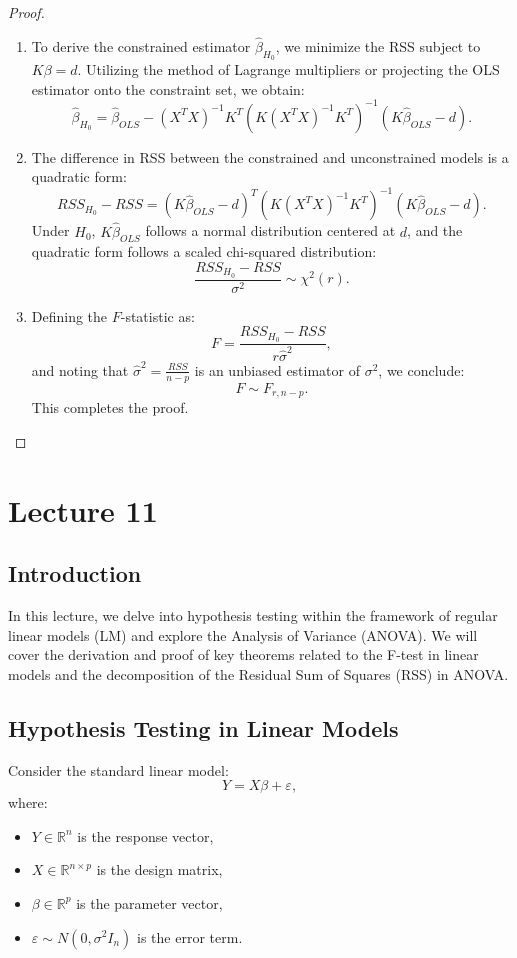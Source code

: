 \documentclass[open=any, 11pt,paper=A4]{scrreprt}
\begin{document}
\begin{proof}
\begin{enumerate}
    \item 
    To derive the constrained estimator \(\hat{\beta}_{H_0}\), we minimize the RSS subject to \(K\beta = d\). Utilizing the method of Lagrange multipliers or projecting the OLS estimator onto the constraint set, we obtain:
    \[
    \hat{\beta}_{H_0} = \hat{\beta}_{OLS} - (X^TX)^{-1} K^T (K (X^TX)^{-1} K^T)^{-1} (K \hat{\beta}_{OLS} - d).
    \]
    
    \item 
    The difference in RSS between the constrained and unconstrained models is a quadratic form:
    \[
    RSS_{H_0} - RSS = (K \hat{\beta}_{OLS} - d)^T (K (X^TX)^{-1} K^T)^{-1} (K \hat{\beta}_{OLS} - d).
    \]
    Under \(H_0\), \(K\hat{\beta}_{OLS}\) follows a normal distribution centered at \(d\), and the quadratic form follows a scaled chi-squared distribution:
    \[
    \frac{RSS_{H_0} - RSS}{\sigma^2} \sim \chi^2(r).
    \]
    
    \item 
    Defining the \(F\)-statistic as:
    \[
    F = \frac{RSS_{H_0} - RSS}{r \hat{\sigma}^2},
    \]
    and noting that \(\hat{\sigma}^2 = \frac{RSS}{n - p}\) is an unbiased estimator of \(\sigma^2\), we conclude:
    \[
    F \sim F_{r, n - p}.
    \]
    This completes the proof.
\end{enumerate}
\end{proof}
\chapter{Lecture 11}
\section{Introduction}

In this lecture, we delve into hypothesis testing within the framework of regular linear models (LM) and explore the Analysis of Variance (ANOVA). We will cover the derivation and proof of key theorems related to the F-test in linear models and the decomposition of the Residual Sum of Squares (RSS) in ANOVA.

\section{Hypothesis Testing in Linear Models}

Consider the standard linear model:
\[
Y = X\beta + \varepsilon,
\]
where:
\begin{itemize}
    \item $Y \in \mathbb{R}^n$ is the response vector,
    \item $X \in \mathbb{R}^{n \times p}$ is the design matrix,
    \item $\beta \in \mathbb{R}^p$ is the parameter vector,
    \item $\varepsilon \sim N(0, \sigma^2 I_n)$ is the error term.
\end{itemize}
\end{document}
